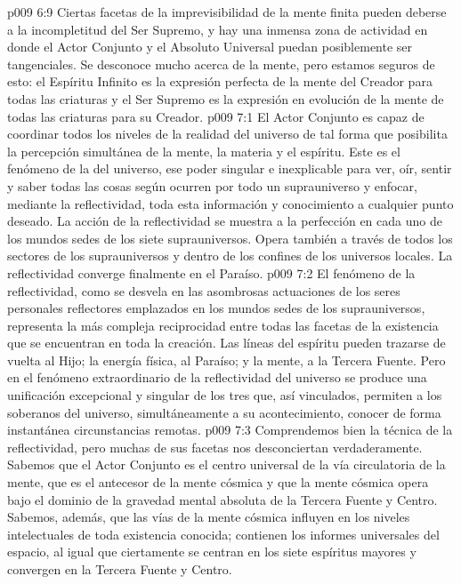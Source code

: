 \vs p009 6:9 \pc Ciertas facetas de la imprevisibilidad de la mente finita pueden deberse a la incompletitud del Ser Supremo, y hay una inmensa zona de actividad en donde el Actor Conjunto y el Absoluto Universal puedan posiblemente ser tangenciales. Se desconoce mucho acerca de la mente, pero estamos seguros de esto: el Espíritu Infinito es la expresión perfecta de la mente del Creador para todas las criaturas y el Ser Supremo es la expresión en evolución de la mente de todas las criaturas para su Creador.
\vs p009 7:1 El Actor Conjunto es capaz de coordinar todos los niveles de la realidad del universo de tal forma que posibilita la percepción simultánea de la mente, la materia y el espíritu. Este es el fenómeno de la  del universo, ese poder singular e inexplicable para ver, oír, sentir y saber todas las cosas según ocurren por todo un suprauniverso y enfocar, mediante la reflectividad, toda esta información y conocimiento a cualquier punto deseado. La acción de la reflectividad se muestra a la perfección en cada uno de los mundos sedes de los siete suprauniversos. Opera también a través de todos los sectores de los suprauniversos y dentro de los confines de los universos locales. La reflectividad converge finalmente en el Paraíso.
\vs p009 7:2 El fenómeno de la reflectividad, como se desvela en las asombrosas actuaciones de los seres personales reflectores emplazados en los mundos sedes de los suprauniversos, representa la más compleja reciprocidad entre todas las facetas de la existencia que se encuentran en toda la creación. Las líneas del espíritu pueden trazarse de vuelta al Hijo; la energía física, al Paraíso; y la mente, a la Tercera Fuente. Pero en el fenómeno extraordinario de la reflectividad del universo se produce una unificación excepcional y singular de los tres que, así vinculados, permiten a los soberanos del universo, simultáneamente a su acontecimiento, conocer de forma instantánea circunstancias remotas.
\vs p009 7:3 Comprendemos bien la técnica de la reflectividad, pero muchas de sus facetas nos desconciertan verdaderamente. Sabemos que el Actor Conjunto es el centro universal de la vía circulatoria de la mente, que es el antecesor de la mente cósmica y que la mente cósmica opera bajo el dominio de la gravedad mental absoluta de la Tercera Fuente y Centro. Sabemos, además, que las vías de la mente cósmica influyen en los niveles intelectuales de toda existencia conocida; contienen los informes universales del espacio, al igual que ciertamente se centran en los siete espíritus mayores y convergen en la Tercera Fuente y Centro.
